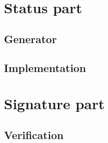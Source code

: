 \documentclass[11pt, a4paper, twoside, openright, openany]{article} %
\begin{document}
\section{Status part}
\subsection{Generator}

\subsection{Implementation}

\section{Signature part}


\subsection{Verification}

\fi


\clearpage
\begingroup
\let\cleardoublepage\clearpage


\endgroup
\end{document}
